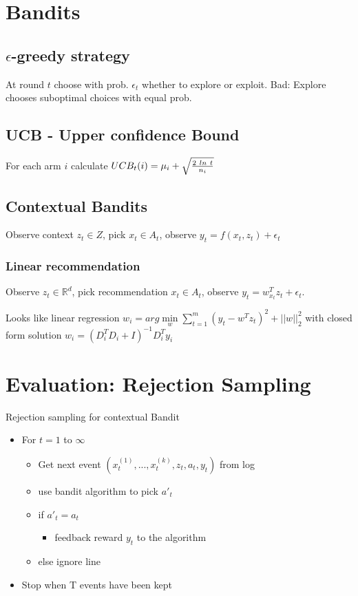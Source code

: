 \documentclass[a4paper,11pt,twocolumn]{article}
\begin{document}
\section{Bandits}

\subsection{$\epsilon$-greedy strategy}
At round $t$ choose with prob. $\epsilon_t$ whether to explore or exploit. Bad: Explore chooses suboptimal choices with equal prob.

\subsection{UCB - Upper confidence Bound}
For each arm $i$ calculate $UCB_t(i) = 
\mu_i + 
\sqrt{{2~ln~t} \over n_i}$	

\subsection{Contextual Bandits}
Observe context $z_t \in Z$, pick $x_t \in A_t$, observe $y_t = f(x_t, z_t) + \epsilon_t$

\subsubsection{Linear recommendation}
Observe $z_t \in \mathbb{R}^d$, pick recommendation $x_t \in A_t$, observe $y_t = w_{x_t}^T z_t + \epsilon_t$.

Looks like linear regression 
$w_i = arg \min \limits_w \sum \limits_{t=1}^m (y_t - w^T z_t)^2 + ||w||_2^2$ 
with closed form solution $w_i = (D_i^T D_i + I)^{-1} D_i^T y_i$

\section{Evaluation: Rejection Sampling}
Rejection sampling for contextual Bandit
\begin{itemize}[noitemsep,topsep=0pt,parsep=0pt,partopsep=0pt]
\item For $t=1$ to $\infty$
\begin{itemize}[noitemsep,topsep=0pt,parsep=0pt,partopsep=0pt]
\item Get next event $(x_t^{(1)},...,x_t^{(k)},z_t,a_t,y_t)$ from log
\item use bandit algorithm to pick $a'_t$
\item if $a'_t = a_t$

\begin{itemize}[noitemsep,topsep=0pt,parsep=0pt,partopsep=0pt]
\item feedback reward $y_t$ to the algorithm
\end{itemize}

\item else ignore line
\end{itemize}
\item Stop when T events have been kept
\end{itemize}
\end{document}
